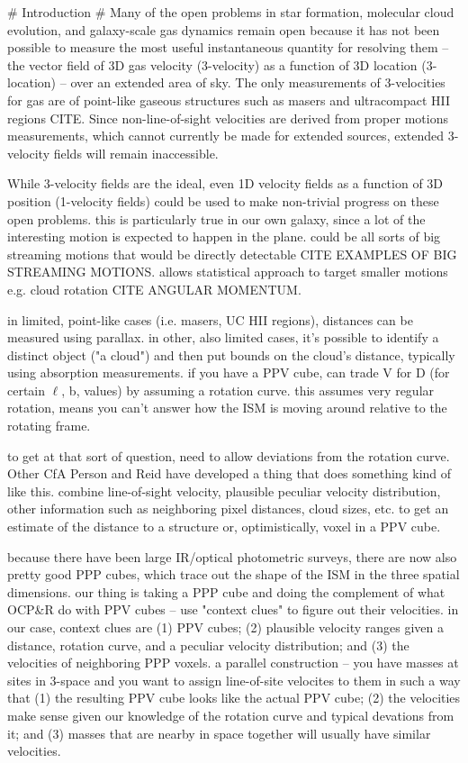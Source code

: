 # Introduction #
Many of the open problems in star formation, molecular cloud evolution, and galaxy-scale gas dynamics remain open because it has not been possible to measure the most useful instantaneous quantity for resolving them -- the vector field of 3D gas velocity (3-velocity) as a function of 3D location (3-location) -- over an extended area of sky. 
The only measurements of 3-velocities for gas are of point-like gaseous structures such as masers and ultracompact HII regions CITE.   
Since non-line-of-sight velocities are derived from proper motions measurements, which cannot currently be made for extended sources, extended 3-velocity fields will remain inaccessible.

While 3-velocity fields are the ideal, even 1D velocity fields as a function of 3D position (1-velocity fields) could be used to make non-trivial progress on these open problems.
this is particularly true in our own galaxy, since a lot of the interesting motion is expected to happen in the plane.
could be all sorts of big streaming motions that would be directly detectable CITE EXAMPLES OF BIG STREAMING MOTIONS.
allows statistical approach to target smaller motions e.g. cloud rotation CITE ANGULAR MOMENTUM.

in limited, point-like cases (i.e. masers, UC HII regions), distances can be measured using parallax.
in other, also limited cases, it's possible to identify a distinct object ("a cloud") and then put bounds on the cloud's distance, typically using absorption measurements. 
if you have a PPV cube, can trade V for D (for certain $\ell$, b, values) by assuming a rotation curve. 
this assumes very regular rotation, means you can't answer how the ISM is moving around relative to the rotating frame.

to get at that sort of question, need to allow deviations from the rotation curve.
Other CfA Person and Reid have developed a thing that does something kind of like this. 
combine line-of-sight velocity, plausible peculiar velocity distribution, other information such as neighboring pixel distances, cloud sizes, etc. to get an estimate of the distance to a structure or, optimistically, voxel in a PPV cube.

because there have been large IR/optical photometric surveys, there are now also pretty good PPP cubes, which trace out the shape of the ISM in the three spatial dimensions. 
our thing is taking a PPP cube and doing the complement of what OCP\&R do with PPV cubes -- use "context clues" to figure out their velocities.
in our case, context clues are (1) PPV cubes; (2) plausible velocity ranges given a distance, rotation curve, and a peculiar velocity distribution; and (3) the velocities of neighboring PPP voxels. 
a parallel construction -- you have masses at sites in 3-space and you want to assign line-of-site velocites to them in such a way that (1) the resulting PPV cube looks like the actual PPV cube; (2) the velocities make sense given our knowledge of the rotation curve and typical devations from it; and (3) masses that are nearby in space together will usually have similar velocities.

